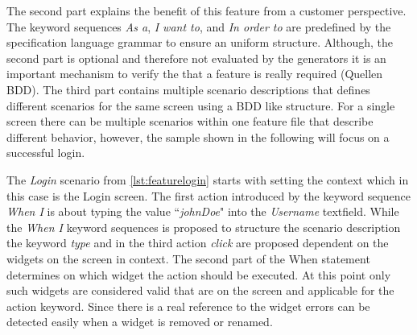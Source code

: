 \documentclass{sig-alternate-05-2015}
\begin{document}
The second part explains the benefit of this feature from a customer perspective. 
The keyword sequences \textit{As a}, \textit{I want to}, and \textit{In order to} are predefined by the specification language grammar to ensure an uniform structure.
Although, the second part is optional and therefore not evaluated by the generators it is an important mechanism to verify the that a feature is really required (Quellen BDD).
The third part contains multiple scenario descriptions that defines different scenarios for the same screen using a BDD like structure.
For a single screen there can be multiple scenarios within one feature file that describe different behavior, however, the sample shown in the following will focus on a successful login.

The \textit{Login} scenario from \cref{lst:featurelogin} starts with setting the context which in this case is the Login screen. 
The first action introduced by the keyword sequence \textit{When I} is about typing the value ``\textit{johnDoe}" into the \textit{Username} textfield. 
While the \textit{When I} keyword sequences is proposed to structure the scenario description the keyword \textit{type} and in the third action \textit{click} are proposed dependent on the widgets on the screen in context.
The second part of the When statement determines on which widget the action should be executed.
At this point only such widgets are considered valid that are on the screen and applicable for the action keyword.
Since there is a real reference to the widget errors can be detected easily when a widget is removed or renamed.
\end{document}
